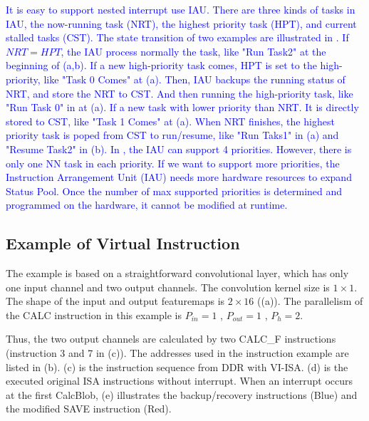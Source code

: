 \textcolor{blue}{
It is easy to support nested interrupt use IAU.
There are three kinds of tasks in IAU, the now-running task (NRT), the highest priority task (HPT), and current stalled tasks (CST).
The state transition of two examples are illustrated in .
If $NRT=HPT$, the IAU process normally the task, like "Run Task2" at the beginning of (a,b).
If a new high-priority task comes, HPT is set to the high-priority, like "Task 0 Comes" at (a). Then, IAU backups the running status of NRT, and store the NRT to CST. And then running the high-priority task, like "Run Task 0" in at (a).
If a new task with lower priority than NRT. It is directly stored to CST, like "Task 1 Comes" at (a).
When NRT finishes, the highest priority task is poped from CST to run/resume, like "Run Taks1" in (a) and "Resume Task2" in (b).
In , the IAU can support 4 priorities. 
However, there is only one NN task in each priority. 
If we want to support more priorities, the Instruction Arrangement Unit (IAU) needs more hardware resources to expand Status Pool.
Once the number of max supported priorities is determined and programmed on the hardware, it cannot be modified at runtime.
}


\subsection{Example of Virtual Instruction}
\label{sec:exampleVirtual}


The example is based on a straightforward convolutional layer, which has only one input channel and two output channels. 
The convolution kernel size is $1 \times 1$. The shape of the input and output featuremaps is $ 2 \times 16 $ ((a)). The parallelism of the CALC instruction in this example is $ P_{in} = 1$ , $ P_{out}=1$ , $P_{h}=2$.

Thus, the two output channels are calculated by two CALC\_F instructions (instruction 3 and 7 in (c)). The addresses used in the instruction example are listed in (b). (c) is the instruction sequence from DDR with VI-ISA. (d) is the executed original ISA instructions without interrupt. When an interrupt occurs at the first CalcBlob, (e) illustrates the backup/recovery instructions (Blue) and the modified SAVE instruction (Red). 

